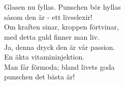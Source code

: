 {\footnotesize{}}\\
\\
Glasen nu fyllas. Punschen bör hyllas\\
såsom den är - ett livselexir!\\
Om kraften sinar, kroppen förtvinar,\\
med detta guld finner man liv.\\
Ja, denna dryck den är vår passion.\\
En äkta vitamininjektion.\\
Man får förmoda; bland livets goda\\
punschen det bästa är!\\
\\
{\footnotesize{}}
